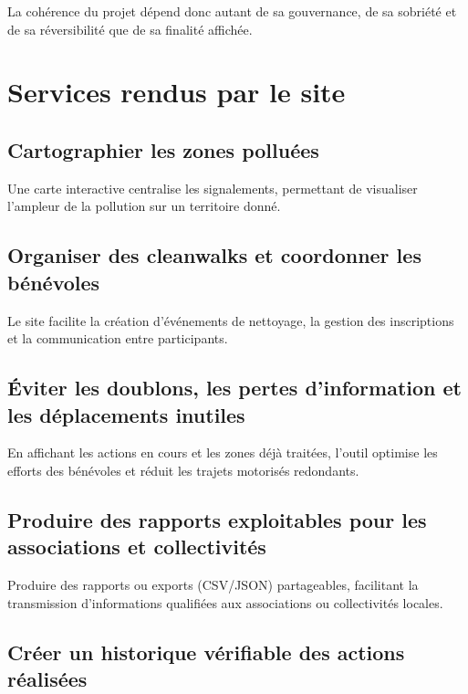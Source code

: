 \documentclass[
  10pt,
  a4paper,
  DIV=11,
  numbers=noendperiod,
  oneside]{scrreprt}
\begin{document}
La cohérence du projet dépend donc autant de sa gouvernance, de sa
sobriété et de sa réversibilité que de sa finalité affichée.

\section{Services rendus par le site}\label{services-rendus-par-le-site}

\subsection{Cartographier les zones
polluées}\label{cartographier-les-zones-polluuxe9es}

Une carte interactive centralise les signalements, permettant de
visualiser l'ampleur de la pollution sur un territoire donné.

\subsection{Organiser des cleanwalks et coordonner les
bénévoles}\label{organiser-des-cleanwalks-et-coordonner-les-buxe9nuxe9voles}

Le site facilite la création d'événements de nettoyage, la gestion des
inscriptions et la communication entre participants.

\subsection{Éviter les doublons, les pertes d'information et les
déplacements
inutiles}\label{uxe9viter-les-doublons-les-pertes-dinformation-et-les-duxe9placements-inutiles}

En affichant les actions en cours et les zones déjà traitées, l'outil
optimise les efforts des bénévoles et réduit les trajets motorisés
redondants.

\subsection{Produire des rapports exploitables pour les associations et
collectivités}\label{produire-des-rapports-exploitables-pour-les-associations-et-collectivituxe9s}

Produire des rapports ou exports (CSV/JSON) partageables, facilitant la
transmission d'informations qualifiées aux associations ou collectivités
locales.

\subsection{Créer un historique vérifiable des actions
réalisées}\label{cruxe9er-un-historique-vuxe9rifiable-des-actions-ruxe9alisuxe9es}
\end{document}
